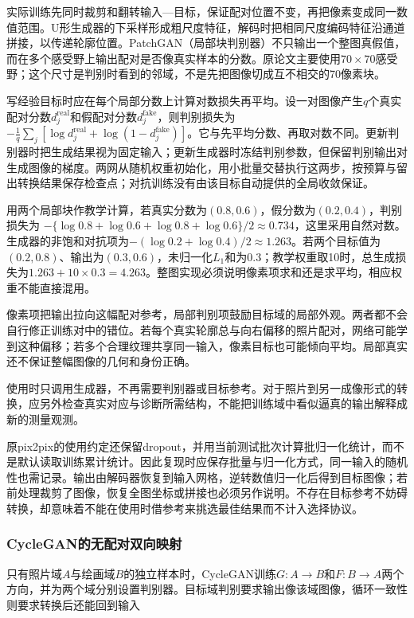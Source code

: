 实际训练先同时裁剪和翻转输入—目标，保证配对位置不变，再把像素变成同一数值范围。U形生成器的下采样形成粗尺度特征，解码时把相同尺度编码特征沿通道拼接，以传递轮廓位置。PatchGAN（局部块判别器）不只输出一个整图真假值，而在多个感受野上输出配对是否像真实样本的分数。原论文主要使用$70\times70$感受野；这个尺寸是判别时看到的邻域，不是先把图像切成互不相交的70像素块。

写经验目标时应在每个局部分数上计算对数损失再平均。设一对图像产生$q$个真实配对分数$d_j^{\mathrm{real}}$和假配对分数$d_j^{\mathrm{fake}}$，则判别损失为
$-\frac1q\sum_j[\log d_j^{\mathrm{real}}+\log(1-d_j^{\mathrm{fake}})]$。它与先平均分数、再取对数不同。更新判别器时把生成结果视为固定输入；更新生成器时冻结判别参数，但保留判别输出对生成图像的梯度。两网从随机权重初始化，用小批量交替执行这两步，按预算与留出转换结果保存检查点；对抗训练没有由该目标自动提供的全局收敛保证。

用两个局部块作教学计算，若真实分数为$(0.8,0.6)$，假分数为$(0.2,0.4)$，判别损失为
$-\{\log0.8+\log0.6+\log0.8+\log0.6\}/2\approx0.734$，这里采用自然对数。生成器的非饱和对抗项为$-(\log0.2+\log0.4)/2\approx1.263$。若两个目标值为$(0.2,0.8)$、输出为$(0.3,0.6)$，未归一化$L_1$和为0.3；教学权重取10时，总生成损失为$1.263+10\times0.3=4.263$。整图实现必须说明像素项求和还是求平均，相应权重不能直接混用。

像素项把输出拉向这幅配对参考，局部判别项鼓励目标域的局部外观。两者都不会自行修正训练对中的错位。若每个真实轮廓总与向右偏移的照片配对，网络可能学到这种偏移；若多个合理纹理共享同一输入，像素目标也可能倾向平均。局部真实还不保证整幅图像的几何和身份正确。

使用时只调用生成器，不再需要判别器或目标参考。对于照片到另一成像形式的转换，应另外检查真实对应与诊断所需结构，不能把训练域中看似逼真的输出解释成新的测量观测。

原pix2pix的使用约定还保留dropout，并用当前测试批次计算批归一化统计，而不是默认读取训练累计统计。因此复现时应保存批量与归一化方式，同一输入的随机性也需记录。输出由解码器恢复到输入网格，逆转数值归一化后得到目标图像；若前处理裁剪了图像，恢复全图坐标或拼接也必须另作说明。不存在目标参考不妨碍转换，却意味着不能在使用时借参考来挑选最佳结果而不计入选择协议。

\subsubsection{CycleGAN的无配对双向映射}
\label{sec:vision-generation-cyclegan}

只有照片域$A$与绘画域$B$的独立样本时，CycleGAN训练$G:A\to B$和$F:B\to A$两个方向，并为两个域分别设置判别器。目标域判别要求输出像该域图像，循环一致性则要求转换后还能回到输入

